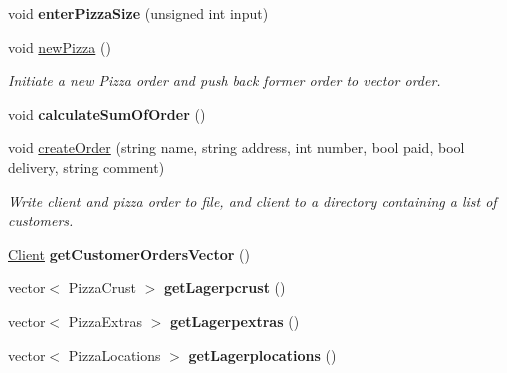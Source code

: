 \begin{CompactItemize}
\item 
\hypertarget{class_sala_caeeb8aada209ebb8bde4749b2ececdc}{
void {\bf enter\-Pizza\-Size} (unsigned int input)}
\label{class_sala_caeeb8aada209ebb8bde4749b2ececdc}

\item 
\hypertarget{class_sala_eadce54d849ca6634b7fdd389bd8f192}{
void \hyperlink{class_sala_eadce54d849ca6634b7fdd389bd8f192}{new\-Pizza} ()}
\label{class_sala_eadce54d849ca6634b7fdd389bd8f192}

\begin{CompactList}\small\item\em Initiate a new Pizza order and push back former order to vector order. \item\end{CompactList}\item 
\hypertarget{class_sala_24b9bb5302a251b41fed3df1fb7ce8ad}{
void {\bf calculate\-Sum\-Of\-Order} ()}
\label{class_sala_24b9bb5302a251b41fed3df1fb7ce8ad}

\item 
void \hyperlink{class_sala_554463c0b82fb266c21e23e040bf1ac0}{create\-Order} (string name, string address, int number, bool paid, bool delivery, string comment)
\begin{CompactList}\small\item\em Write client and pizza order to file, and client to a directory containing a list of customers. \item\end{CompactList}\item 
\hypertarget{class_sala_3a31e5a83058a950f863932d3ecaef2e}{
\hyperlink{class_client}{Client} {\bf get\-Customer\-Orders\-Vector} ()}
\label{class_sala_3a31e5a83058a950f863932d3ecaef2e}

\item 
\hypertarget{class_sala_85a631cad1f4009e87de7da3bc52174c}{
vector$<$ Pizza\-Crust $>$ {\bf get\-Lagerpcrust} ()}
\label{class_sala_85a631cad1f4009e87de7da3bc52174c}

\item 
\hypertarget{class_sala_49f231948b80188691882a8624a4612d}{
vector$<$ Pizza\-Extras $>$ {\bf get\-Lagerpextras} ()}
\label{class_sala_49f231948b80188691882a8624a4612d}

\item 
\hypertarget{class_sala_1e720a42845186f5057b36ab8b69711a}{
vector$<$ Pizza\-Locations $>$ {\bf get\-Lagerplocations} ()}
\label{class_sala_1e720a42845186f5057b36ab8b69711a}


\end{CompactItemize}
